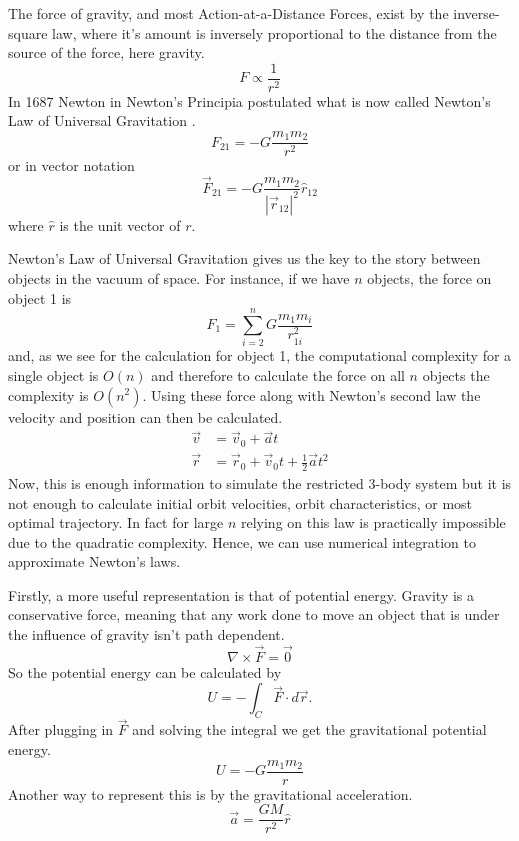 \documentclass{article}
\begin{document}
The force of gravity, and most Action-at-a-Distance Forces, exist by the inverse-square law, where it's amount is inversely proportional to the distance from the source of the force, here gravity. $$F\propto \frac{1}{r^2}$$ In 1687 Newton in Newton's Principia postulated what is now called Newton's Law of Universal Gravitation \cite{rohrlich_1999}. $$F_{21}=-G\frac{m_1m_2}{r^2}$$ or in vector notation 
\begin{equation}
\vec{F}_{21}=-G\frac{m_1m_2}{|\vec{r}_{12}|^2}\hat{r}_{12}
\end{equation}
 where $\hat{r}$ is the unit vector of $r$.

Newton's Law of Universal Gravitation gives us the key to the story between objects in the vacuum of space. For instance, if we have $n$ objects, the force on object 1 is $$F_1=\sum_{i=2}^n{G\frac{m_1 m_i}{r_{1i}^2}}$$ and, as we see for the calculation for object 1, the computational complexity for a single object is $O(n)$ and therefore to calculate the force on all $n$ objects the complexity is $O(n^2)$. Using these force along with Newton's second law the velocity and position can then be calculated.
\begin{align}
	\vec{v} &= \vec{v}_0+\vec{a}t \label{eq:vel}\\
	\vec{r} &= \vec{r}_0+\vec{v}_0 t+\frac{1}{2}\vec{a}t^2\label{eq:pos}
\end{align}
Now, this is enough information to simulate the restricted 3-body system but it is not enough to calculate initial orbit velocities, orbit characteristics, or most optimal trajectory. In fact for large $n$ relying on this law is practically impossible due to the quadratic complexity. Hence, we can use numerical integration to approximate Newton's laws.

Firstly, a more useful representation is that of potential energy. Gravity is a conservative force, meaning that any work done to move an object that is under the influence of gravity isn't path dependent. $$\nabla\times \vec{F}=\vec{0}$$ 
So the potential energy can be calculated by $$U=-\int_C \vec{F}\cdot d\vec{r}.$$ After plugging in $\vec{F}$ and solving the integral we get the gravitational potential energy.
\begin{equation} \label{eq:gravpotential}
U=-G\frac{m_1m_2}{r}
\end{equation}
Another way to represent this is by the gravitational acceleration. 
\begin{equation}
\vec{a}=\frac{GM}{r^2}\hat{r}
\end{equation}
\end{document}
